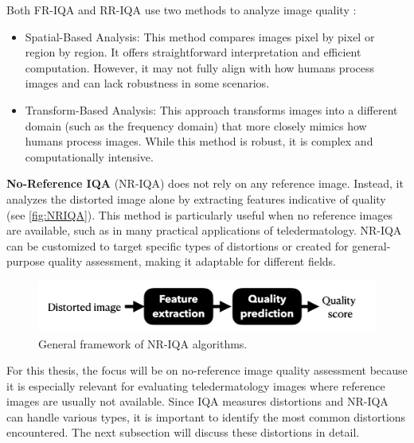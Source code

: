 \noindent
Both FR-IQA and RR-IQA use two methods to analyze image quality \autocite{D}:
\begin{itemize}
    \item Spatial-Based Analysis: This method compares images pixel by pixel or region by region. It offers straightforward interpretation and efficient computation. However, it may not fully align with how humans process images and can lack robustness in some scenarios.
    \item Transform-Based Analysis: This approach transforms images into a different domain (such as the frequency domain) that more closely mimics how humans process images. While this method is robust, it is complex and computationally intensive.
\end{itemize}
\vspace{\baselineskip}
\noindent
\textbf{No-Reference IQA} (NR-IQA) does not rely on any reference image. Instead, it analyzes the distorted image alone by extracting features indicative of quality (see \autoref{fig:NRIQA}). This method is particularly useful when no reference images are available, such as in many practical applications of teledermatology. NR-IQA can be customized to target specific types of distortions or created for general-purpose quality assessment, making it adaptable for different fields. \par
\begin{figure}[ht]
    \centering
    \includegraphics[keepaspectratio,width=12cm]{img/NRIQA.jpg}
    \caption{General framework of NR-IQA algorithms.}
    \label{fig:NRIQA}
\end{figure}
\clearpage
\noindent
For this thesis, the focus will be on no-reference image quality assessment because it is especially relevant for evaluating teledermatology images where reference images are usually not available. Since IQA measures distortions and NR-IQA can handle various types, it is important to identify the most common distortions encountered. The next subsection will discuss these distortions in detail. \par

